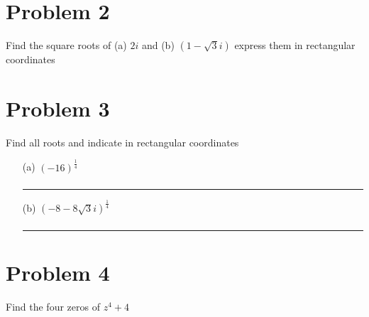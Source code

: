 \documentclass{article}
\begin{document}
\vspace{.5cm} %


\newpage
\section*{Problem 2}
Find the square roots of (a) $2i$ and (b) $(1-\sqrt{3}i)$ express them in rectangular coordinates
\newpage
\section*{Problem 3}
Find all roots and indicate in rectangular coordinates
\begin{enumerate}
\item[(a)] $(-16)^{\frac{1}{4}}$
  \begin{align*}
  \end{align*}
\hrule
\item[(b)] $(-8-8\sqrt{3}i)^{\frac{1}{4}}$
  \begin{align*}
  \end{align*}
\hrule
\end{enumerate}


\newpage

\section*{Problem 4}
Find the four zeros of $z^4+4$
\end{document}
